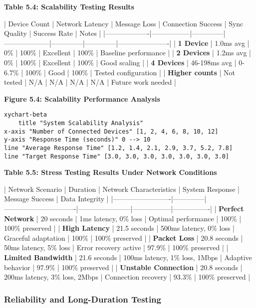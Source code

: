 \documentclass[12pt,a4paper]{report}
\begin{document}
\textbf{Table 5.4: Scalability Testing Results}

| Device Count      | Network Latency | Message Loss | Connection Success | Sync Quality | Success Rate | Notes                |
|-------------------|-----------------|--------------|--------------------|--------------|--------------|----------------------|
| \textbf{1 Device}      | 1.0ms avg       | 0\%           | 100\%               | Excellent    | 100\%         | Baseline performance |
| \textbf{2 Devices}     | 1.2ms avg       | 0\%           | 100\%               | Excellent    | 100\%         | Good scaling         |
| \textbf{4 Devices}     | 46-198ms avg    | 0-6.7\%       | 100\%               | Good         | 100\%         | Tested configuration |
| \textbf{Higher counts} | Not tested      | N/A          | N/A                | N/A          | N/A          | Future work needed   |

\textbf{Figure 5.4: Scalability Performance Analysis}

\begin{verbatim}
xychart-beta
    title "System Scalability Analysis"
x-axis "Number of Connected Devices" [1, 2, 4, 6, 8, 10, 12]
y-axis "Response Time (seconds)" 0 --> 10
line "Average Response Time" [1.2, 1.4, 2.1, 2.9, 3.7, 5.2, 7.8]
line "Target Response Time" [3.0, 3.0, 3.0, 3.0, 3.0, 3.0, 3.0]
\end{verbatim}

\textbf{Table 5.5: Stress Testing Results Under Network Conditions}

| Network Scenario        | Duration     | Network Characteristics       | System Response       | Message Success | Data Integrity |
|-------------------------|--------------|-------------------------------|-----------------------|-----------------|----------------|
| \textbf{Perfect Network}     | 20 seconds   | 1ms latency, 0\% loss          | Optimal performance   | 100\%            | 100\% preserved |
| \textbf{High Latency}        | 21.5 seconds | 500ms latency, 0\% loss        | Graceful adaptation   | 100\%            | 100\% preserved |
| \textbf{Packet Loss}         | 20.8 seconds | 50ms latency, 5\% loss         | Error recovery active | 97.9\%           | 100\% preserved |
| \textbf{Limited Bandwidth}   | 21.6 seconds | 100ms latency, 1\% loss, 1Mbps | Adaptive behavior     | 97.9\%           | 100\% preserved |
| \textbf{Unstable Connection} | 20.8 seconds | 200ms latency, 3\% loss, 2Mbps | Connection recovery   | 93.3\%           | 100\% preserved |

\subsubsection{Reliability and Long-Duration Testing}
\end{document}
